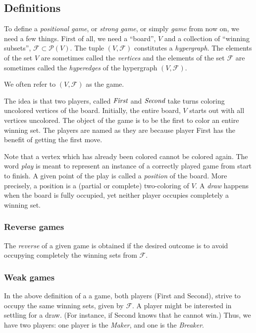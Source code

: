 \subsection{Definitions}

To define a \emph{positional game}, or \emph{strong game}, or simply \emph{game} from now on, we need a few things.
First of all, we need a ``board'', $V$ and a collection of ``winning subsets'', $\mathcal F \subset \mathcal P(V)$.
The tuple $(V,\mathcal F)$ constitutes a \emph{hypergraph}.
The elements of the set $V$ are sometimes called the \emph{vertices} and the elements of the set $\mathcal F$ are sometimes called the \emph{hyperedges} of the hypergraph $(V,\mathcal F)$.

\begin{remark}
We often refer to $(V,\mathcal F)$ as the game.
\end{remark}

The idea is that two players, called $\emph{First}$ and $\emph{Second}$ take turns coloring uncolored vertices of the board.
Initially, the entire board, $V$ starts out with all vertices uncolored.
The object of the game is to be the first to color an entire winning set. The players are named as they are because player First has the benefit of getting the first move.

Note that a vertex which has already been colored cannot be colored again.
The word \emph{play} is meant to represent an instance of a correctly played game from start to finish.
A given point of the play is called a \emph{position} of the board.
More precisely, a position is a (partial or complete) two-coloring of $V$.
A \emph{draw} happens when the board is fully occupied, yet neither player occupies completely a winning set.

\subsubsection{Reverse games}

The \emph{reverse} of a given game is obtained if the desired outcome is to avoid occupying completely the winning sets from $\mathcal F$.

\subsubsection{Weak games}

In the above definition of a a game, both players (First and Second), strive to occupy the same winning sets, given by $\mathcal F$. A player might be interested in settling for a draw. (For instance, if Second knows that he cannot win.) Thus, we have two players: one player is the \emph{Maker}, and one is the \emph{Breaker}.

